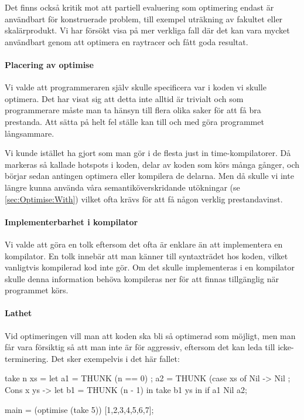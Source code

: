 \documentclass[Rapport]{subfiles}
\begin{document}
Det finns också kritik mot att partiell evaluering som optimering endast är användbart för konstruerade problem, till exempel uträkning av fakultet eller skalärprodukt. Vi har försökt visa på mer verkliga fall där det kan vara mycket användbart genom att optimera en raytracer och fått goda resultat. 


\paragraph{Placering av optimise}

Vi valde att programmeraren själv skulle  specificera var i koden vi skulle optimera. Det har visat sig att detta inte alltid är trivialt och som programmerare måste man ta hänsyn till flera olika saker för att få bra prestanda. Att sätta  på helt fel ställe kan till och med göra programmet långsammare.

Vi kunde istället ha gjort som man gör i de flesta just in time-kompilatorer. Då markeras så kallade hotspots i koden, delar av koden som körs många gånger, och börjar sedan antingen optimera eller kompilera de delarna. Men då skulle vi inte längre kunna använda våra semantiköverskridande utökningar (se \ref{sec:Optimise:With}) vilket ofta krävs för att få någon verklig prestandavinst. 


\paragraph{Implementerbarhet i kompilator}
Vi valde att göra en tolk eftersom det ofta är enklare än att implementera en kompilator.
En tolk innebär att man känner till syntaxträdet hos koden, vilket vanligtvis kompilerad
kod inte gör. Om det skulle implementeras i en kompilator skulle
denna information behöva kompileras ner för att finnas tillgänglig när programmet körs.


\paragraph{Lathet}
Vid optimeringen vill man att koden ska bli så optimerad som möjligt, men man får
vara försiktig så att man inte är för aggressiv, 
eftersom det kan leda till icke-terminering. Det sker exempelvis i det här fallet:

\begin{codeEx}
take n xs = let
    { a1 = THUNK (n == 0)
    ; a2 = THUNK (case xs of
        { Nil -> Nil
        ; Cons x ys -> let
            { b1 = THUNK (n - 1)
            } in take b1 ys
        }
    } in if a1 Nil a2;

main = (optimise (take 5)) [1,2,3,4,5,6,7];
\end{codeEx}
\end{document}
